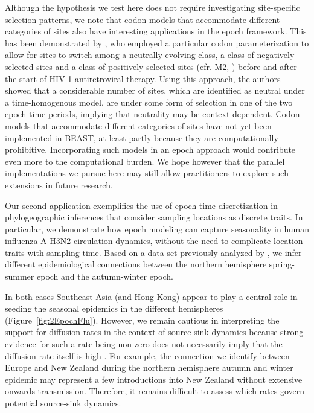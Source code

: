 Although the hypothesis we test here does not require investigating site-specific selection patterns, we note that codon models that accommodate different categories of sites also have interesting applications in the epoch framework.
This has been demonstrated by \citet{Goode2008}, who employed a particular codon parameterization to allow for sites to switch among a neutrally evolving class, a class of negatively selected sites and a class of positively selected sites (cfr. M2, \citet{NY98}) before and after the start of HIV-1 antiretroviral therapy.
Using this approach, the authors showed that a considerable number of sites, which are identified as neutral under a time-homogenous model, are under some form of selection in one of the two epoch time periods, implying that neutrality may be context-dependent.
Codon models that accommodate different categories of sites have not yet been implemented in BEAST, at least partly because they are computationally prohibitive.
Incorporating such models in an epoch approach would contribute even more to the computational burden.
We hope however that the parallel implementations we pursue here may still allow practitioners to explore such extensions in future research. %

Our second application exemplifies  the use of epoch time-discretization in phylogeographic inferences that consider sampling locations as discrete traits.
In particular, we demonstrate how epoch modeling can capture seasonality in human influenza A H3N2 circulation dynamics, without the need to complicate location traits with sampling time.
Based on a data set previously analyzed by \citet{Bahl2011}, we infer different epidemiological connections between the northern hemisphere spring-summer epoch and the autumn-winter epoch.

In both cases Southeast Asia (and Hong Kong) appear to play a central role in seeding the seasonal epidemics in the different hemispheres (Figure~\ref{fig:2EpochFlu}). 
However, we remain cautious in interpreting the support for diffusion rates in the context of source-sink dynamics because strong evidence for such a rate being non-zero does not necessarily imply that the diffusion rate itself is high \citep{Faria2013}.
For example, the connection we identify between Europe and New Zealand during the northern hemisphere autumn and winter epidemic may represent a few introductions into New Zealand without extensive onwards transmission.
Therefore, it remains difficult to assess which rates govern potential source-sink dynamics.

